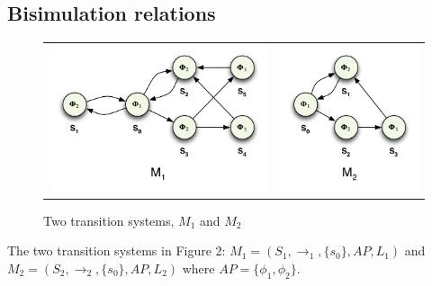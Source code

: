 \documentclass[12pt]{report}
\begin{document}
\subsection*{Bisimulation relations}
\begin{figure}[H]
	\centering
	\begin{tabular}{ l r }
		\includegraphics[scale=0.75]{../GFX/ExerciseFigure2-M1.pdf}
		& \includegraphics[scale=0.75]{../GFX/ExerciseFigure2-M2.pdf}
	\end{tabular}
	\caption{Two transition systems, $M_1$ and $M_2$}
\end{figure}
The two transition systems in Figure 2: $M_1 = (S_1,\rightarrow_1,\{s_0\},AP,L_1)$ and $M_2 = (S_2,\rightarrow_2,\{s_0\},AP,L_2)$ where $AP = \{\phi_1, \phi_2\}$.\\
\end{document}
